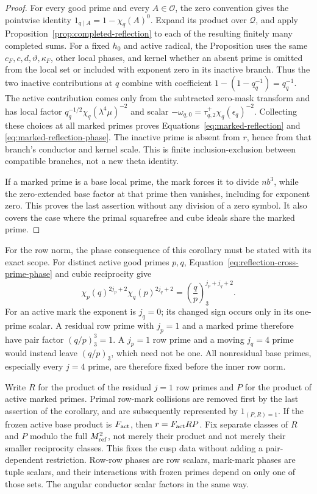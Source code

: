 \documentclass[11pt,a4paper]{article}
\numberwithin{equation}{section}
\numberwithin{figure}{section}
\theoremstyle{definition}
\theoremstyle{remark}
\begin{document}
\begin{proof}
For every good prime and every \(A\in\mathcal O\), the zero convention gives
the pointwise identity \(1_{q\mid A}=1-\chi_q(A)^0\).  Expand its product over
\(\mathcal Q\), and apply Proposition~\ref{prop:completed-reflection} to each
of the resulting finitely many completed sums.  For a fixed \(h_0\) and
active radical, the Proposition uses the same \(c_F,c,d,\vartheta,\kappa_F\),
other local phases, and kernel whether an absent prime is omitted from the
local set or included with exponent zero in its inactive branch.  Thus the
two inactive contributions at \(q\) combine with coefficient
\(1-(1-q_q^{-1})=q_q^{-1}\).  The active contribution comes only from the
subtracted zero-mask transform and has local factor
\(q_q^{-1/2}\chi_q(\lambda^4\mu)^{-2}\) and scalar
\(-\omega_{q,0}=\tau_{q,2}^{+}\chi_q(\epsilon_q)^{-2}\).
Collecting these choices at all marked primes proves
Equations~\eqref{eq:marked-reflection} and
\eqref{eq:marked-reflection-phase}.  The inactive prime is absent from
\(r\), hence from that branch's conductor and kernel scale.  This is finite
inclusion-exclusion between compatible branches, not a new theta identity.

If a marked prime is a base local prime, the mark forces it to divide
\(nb^3\), while the zero-extended base factor at that prime then vanishes,
including for exponent zero.  This proves the last assertion without any
division of a zero symbol.  It also covers the case where the primal
squarefree and cube ideals share the marked prime.
\end{proof}

For the row norm, the phase consequence of this corollary must be stated
with its exact scope.  For distinct active good primes \(p,q\),
Equation~\eqref{eq:reflection-cross-prime-phase} and cubic reciprocity give
\begin{equation}\label{eq:reflection-pair-phase}
 \chi_p(q)^{2j_p+2}\chi_q(p)^{2j_q+2}
       =\left(\frac qp\right)_3^{j_p+j_q+2}.
\end{equation}
For an active mark the exponent is \(j_q=0\); its changed sign occurs only
in its one-prime scalar.  A residual row prime with \(j_p=1\) and a marked
prime therefore have pair factor \((q/p)_3^3=1\).  A \(j_p=1\) row prime
and a moving \(j_q=4\) prime would instead leave \((q/p)_3\), which need
not be one.  All nonresidual base primes, especially every \(j=4\) prime,
are therefore fixed before the inner row norm.

Write \(R\) for the product of the residual \(j=1\) row primes and \(P\)
for the product of active marked primes.  Primal row-mark collisions are
removed first by the last assertion of the corollary, and are subsequently
represented by \(1_{(P,R)=1}\).  If the frozen active base product is
\(F_{\rm act}\), then \(r=F_{\rm act}RP\).  Fix separate classes of \(R\)
and \(P\) modulo the full \(M_{\rm ref}^2\), not merely their product and
not merely their smaller reciprocity classes.  This fixes the cusp data
without adding a pair-dependent restriction.  Row-row phases are row
scalars, mark-mark phases are tuple scalars, and their interactions with
frozen primes depend on only one of those sets.  The angular conductor
scalar factors in the same way.
\end{document}
